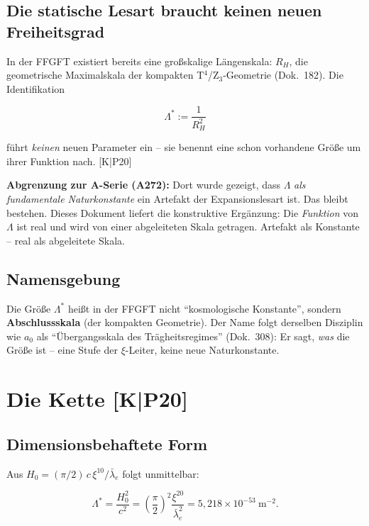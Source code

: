 \section{Die statische Lesart braucht keinen neuen Freiheitsgrad}

In der FFGFT existiert bereits eine großskalige Längenskala:
$R_H$, die geometrische Maximalskala der kompakten
T$^4$/Z$_3$-Geometrie (Dok.~182). Die Identifikation

\begin{equation}
  \Lambda^{*} := \frac{1}{R_H^2}
  \label{eq:def}
\end{equation}

führt \emph{keinen} neuen Parameter ein -- sie benennt eine schon
vorhandene Größe um ihrer Funktion nach. [K|P20]

\textbf{Abgrenzung zur A-Serie (A272):} Dort wurde gezeigt, dass
$\Lambda$ \emph{als fundamentale Naturkonstante} ein Artefakt der
Expansionslesart ist. Das bleibt bestehen. Dieses Dokument liefert die
konstruktive Ergänzung: Die \emph{Funktion} von $\Lambda$ ist real und
wird von einer abgeleiteten Skala getragen. Artefakt als Konstante --
real als abgeleitete Skala.

\section{Namensgebung}

Die Größe $\Lambda^{*}$ heißt in der FFGFT nicht
\enquote{kosmologische Konstante}, sondern \textbf{Abschlussskala}
(der kompakten Geometrie). Der Name folgt derselben Disziplin wie
$a_0$ als \enquote{Übergangsskala des Trägheitsregimes} (Dok.~308):
Er sagt, \emph{was} die Größe ist -- eine Stufe der $\xi$-Leiter,
keine neue Naturkonstante.

\chapter{Die Kette [K|P20]}

\section{Dimensionsbehaftete Form}

Aus $H_0 = (\pi/2)\,c\,\xi^{10}/\bar\lambda_e$ folgt unmittelbar:

\begin{equation}
  \Lambda^{*}
  = \frac{H_0^2}{c^2}
  = \left(\frac{\pi}{2}\right)^{2}\frac{\xi^{20}}{\bar\lambda_e^{2}}
  = 5{,}218\times10^{-53}~\text{m}^{-2}.
  \label{eq:kette}
\end{equation}

